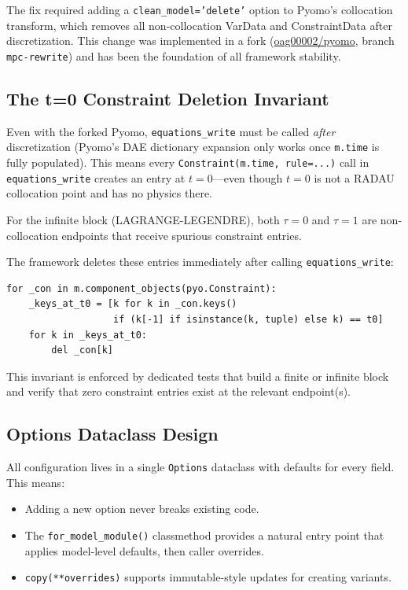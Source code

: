 \documentclass[11pt,letterpaper]{article}
\begin{document}
The fix required adding a \texttt{clean\_model='delete'} option to Pyomo's collocation transform, which removes all non-collocation VarData and ConstraintData after discretization. This change was implemented in a fork (\href{https://github.com/oag00002/pyomo}{oag00002/pyomo}, branch \texttt{mpc-rewrite}) and has been the foundation of all framework stability.

\subsection{The t=0 Constraint Deletion Invariant}

Even with the forked Pyomo, \texttt{equations\_write} must be called \emph{after} discretization (Pyomo's DAE dictionary expansion only works once \texttt{m.time} is fully populated). This means every \texttt{Constraint(m.time, rule=...)} call in \texttt{equations\_write} creates an entry at $t=0$---even though $t=0$ is not a RADAU collocation point and has no physics there.

For the infinite block (LAGRANGE-LEGENDRE), both $\tau=0$ and $\tau=1$ are non-collocation endpoints that receive spurious constraint entries.

The framework deletes these entries immediately after calling \texttt{equations\_write}:

\begin{lstlisting}
for _con in m.component_objects(pyo.Constraint):
    _keys_at_t0 = [k for k in _con.keys()
                   if (k[-1] if isinstance(k, tuple) else k) == t0]
    for k in _keys_at_t0:
        del _con[k]
\end{lstlisting}

This invariant is enforced by dedicated tests that build a finite or infinite block and verify that zero constraint entries exist at the relevant endpoint(s).

\subsection{Options Dataclass Design}

All configuration lives in a single \texttt{Options} dataclass with defaults for every field. This means:
\begin{itemize}[leftmargin=2em]
  \item Adding a new option never breaks existing code.
  \item The \texttt{for\_model\_module()} classmethod provides a natural entry point that applies model-level defaults, then caller overrides.
  \item \texttt{copy(**overrides)} supports immutable-style updates for creating variants.
\end{itemize}
\end{document}
